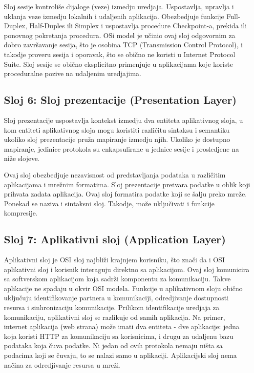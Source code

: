 \documentclass[a4paper,12pt, master]{etf}
\begin{document}
	Sloj sesije kontroli\v{s}e dijaloge (veze) izmedju uredjaja. Uspostavlja,
	upravlja i uklanja veze izmedju lokalnih i udaljenih aplikacija.
	Obezbedjuje funkcije Full-Duplex, Half-Duples ili Simplex i uspostavlja
	procedure Checkpoint-a, prekida ili ponovnog pokretanja procedura. OSi
	model je u\v{c}inio ovaj sloj odgovornim za dobro zavr\v{s}avanje sesija,
	\v{s}to je osobina TCP (Transmission Control Protocol), i takodje proveru
	sesija i oporavak, \v{s}to se obi\v{c}no ne koristi u Internet Protocol
	Suite. Sloj sesije se obi\v{c}no eksplicitno primenjuje u aplikacijama koje
	koriste proceduralne pozive na udaljenim uredjajima.

	\subsection{Sloj 6: Sloj prezentacije (Presentation Layer)}

	Sloj prezentacije uspostavlja kontekst izmedju dva entiteta aplikativnog
	sloja, u kom entiteti aplikativnog sloja mogu koristiti razli\v{c}itu
	sintaksu i semantiku ukoliko sloj prezentacije pru\v{z}a mapiranje izmedju
	njih. Ukoliko je dostupno mapiranje, jedinice protokola su enkapsulirane u
	jednice sesije i prosledjene na ni\v{z}e slojeve.

	Ovaj sloj obezbedjuje nezavisnost od predstavljanja podataka u
	razli\v{c}itim aplikacijama i mre\v{z}nim formatima. Sloj prezentacije
	pretvara podatke u oblik koji prihvata zadata aplikacija. Ovaj sloj
	formatira podatke koji se \v{s}alju preko mre\v{z}e. Ponekad se naziva i
	sintaksni sloj.	Takodje, mo\v{z}e uklju\v{c}ivati i funkcije kompresije.

	\subsection{Sloj 7: Aplikativni sloj (Application Layer)}

	Aplikativni sloj je OSI sloj najbli\v{z}i krajnjem korisniku, \v{s}to
	zna\v{c}i da i OSI aplikativni sloj i korisnik interaguju direktno sa
	aplikacijom. Ovaj sloj komunicira sa softverskom aplikacijom koja
	sadr\v{z}i komponentu za komunikaciju. Takve aplikacije ne spadaju u okvir
	OSI modela.	Funkcije u aplikativnom sloju obi\v{c}no uklju\v{c}uju
	identifikovanje partnera u komunikaciji, odredjivanje dostupnosti resursa i
	sinhronizaciju komunikacije. Prilikom identifikacije uredjaja za
	komunikaciju, aplikativni sloj se razlikuje od samih aplikacija. Na primer,
	internet aplikacija (web strana) mo\v{z}e imati dva entiteta - dve
	aplikacije: jedna koja koristi HTTP za komunikaciju sa korisnicima, i drugu
	za udaljenu	bazu podataka koja \v{c}uva podatke. Ni jedan od ovih protokola
	nemaju ni\v{s}ta sa podacima koji se \v{c}uvaju, to se nalazi samo u
	aplikaciji. Aplikacijski sloj nema na\v{c}ina za odredjivanje resursa u
	mre\v{z}i.
\end{document}
